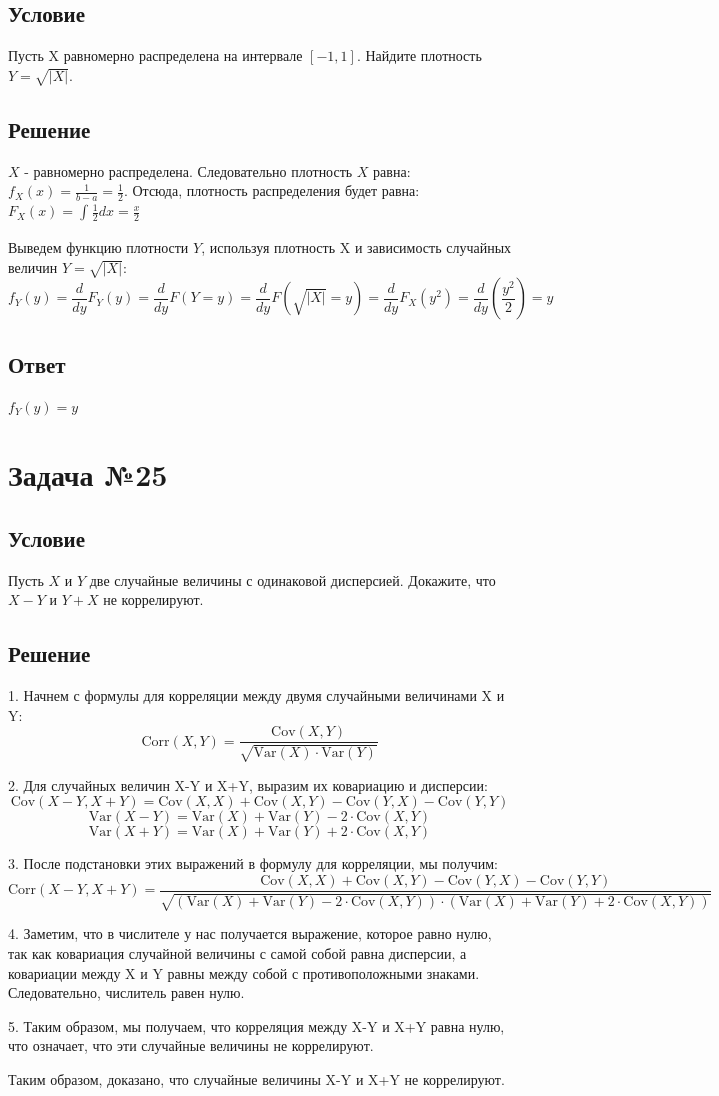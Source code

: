 \documentclass{article}
\begin{document}
\subsection*{Условие}
 Пусть X равномерно распределена на интервале \([-1,1]\). Найдите плотность \(Y=\sqrt{|X|}\).
\subsection*{Решение}
$X$ - равномерно распределена. Следовательно плотность $X$ равна: $f_X(x) = \frac{1}{b-a} = \frac{1}{2}$. Отсюда, плотность распределения будет равна: $F_X(x) = \int_{}^{}\frac{1}{2}dx = \frac{x}{2}$

Выведем функцию плотности $Y$, используя плотность X и зависимость случайных величин $Y=\sqrt{|X|}$:
\[
    f_Y(y) = \frac{d}{dy}F_Y(y) = \frac{d}{dy}F(Y=y) = \frac{d}{dy}F(\sqrt{|X|}=y) = \frac{d}{dy}F_X(y^2) = \frac{d}{dy}\left(\frac{y^2}{2}\right) = y
\]

\subsection*{Ответ}
$ f_Y(y) = y$
\section*{Задача №25}
\subsection*{Условие}
Пусть \(X\) и \(Y\) две случайные величины с одинаковой дисперсией. Докажите,
что  \(X-Y\) и \(Y+X\) не коррелируют. 
\subsection*{Решение}

1. Начнем с формулы для корреляции между двумя случайными величинами X и Y:
\[ \text{Corr}(X, Y) = \frac{\text{Cov}(X, Y)}{\sqrt{\text{Var}(X) \cdot \text{Var}(Y)}} \]

2. Для случайных величин X-Y и X+Y, выразим их ковариацию и дисперсии:
\[ \text{Cov}(X-Y, X+Y) = \text{Cov}(X, X) + \text{Cov}(X, Y) - \text{Cov}(Y, X) - \text{Cov}(Y, Y) \]
\[ \text{Var}(X-Y) = \text{Var}(X) + \text{Var}(Y) - 2 \cdot \text{Cov}(X, Y) \]
\[ \text{Var}(X+Y) = \text{Var}(X) + \text{Var}(Y) + 2 \cdot \text{Cov}(X, Y) \]

3. После подстановки этих выражений в формулу для корреляции, мы получим:
\[ \text{Corr}(X-Y, X+Y) = \frac{\text{Cov}(X, X) + \text{Cov}(X, Y) - \text{Cov}(Y, X) - \text{Cov}(Y, Y)}{\sqrt{(\text{Var}(X) + \text{Var}(Y) - 2 \cdot \text{Cov}(X, Y)) \cdot (\text{Var}(X) + \text{Var}(Y) + 2 \cdot \text{Cov}(X, Y))}} \]

4. Заметим, что в числителе у нас получается выражение, которое равно нулю, так как ковариация случайной величины с самой собой равна дисперсии, а ковариации между X и Y равны между собой с противоположными знаками. Следовательно, числитель равен нулю.

5. Таким образом, мы получаем, что корреляция между X-Y и X+Y равна нулю, что означает, что эти случайные величины не коррелируют.

Таким образом, доказано, что случайные величины X-Y и X+Y не коррелируют.
\end{document}
